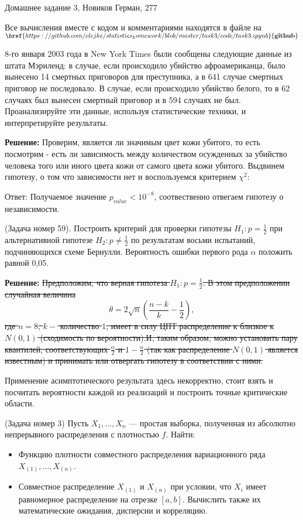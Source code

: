 \documentclass[12pt]{article}
\theoremstyle{definiton}
\theoremstyle{definition}
\theoremstyle{definition}
\newcounter{problem}
\newcounter{subproblem}
\def\prp{\medskip\noindent\stepcounter{problem}{\bf Задача \theproblem .  }\setcounter{subproblem}{0} }
\begin{document}
\centerline{\LARGE Домашнее задание 3, Новиков Герман, 277}

\medskip

Все вычисления вместе с кодом и комментариями находятся в файле на $\href{https://github.com/elejke/statistics_homework/blob/master/task3/code/task3.ipynb}{\textbf{github}}$

\prp 8-го января 2003 года в New York Times были сообщены следующие
данные из штата Мэриленд: в случае, если происходило убийство афроамериканца,
было вынесено 14 смертных приговоров для преступника, а в 641 случае смертных
приговор не последовало. В случае, если происходило убийство белого, то в 62
случаях был вынесен смертный приговор и в 594 случаях не был. Проанализируйте
эти данные, используя статистические техники, и интерпретируйте результаты.


\textbf{Решение: } Проверим, является ли значимым цвет кожи убитого, то есть посмотрим - есть ли зависимость между количеством осужденных за убийство человека того или иного цвета кожи от самого цвета кожи убитого. Выдвинем гипотезу, о том что зависимости нет и воспользуемся критерием $\chi^2$:


Ответ:
Получаемое значение $p_{value} < 10^{-8}$, соотвественно отвегаем гипотезу о независимости.

\prp (Задача номер 59). Построить критерий для проверки гипотезы $H_1 : p = \frac12$ при альтернативной гипотезе $H_2 : p \neq \frac12$ по результатам восьми испытаний, подчиняющихся схеме Бернулли. Вероятность ошибки первого рода $\alpha$ положить равной 0,05.


\textbf{Решение: } \sout{Предположим, что верная гипотеза $H_1 : p = \frac12$. В этом предположении случайная величина} $$\theta = 2\sqrt{n} (\frac{n-k}{k} - \frac12),$$ \sout{где $n = 8$, $k-$ количество $1$, имеет в силу ЦПТ распределение к близкое к $N(0,1)$ (сходимость по вероятности).И, таким образом, можно установить пару квантилей, соответствующих $\frac{\alpha}{2}$ и $1 - \frac{\alpha}{2}$ (так как распределение $N(0,1)$ является известным) и принимать или отвергать гипотезу в соответствии с ними.}

Применение асимптотического результата здесь некорректно, стоит взять и посчитать вероятности каждой из реализаций и построить точные критические области.



\prp (Задача номер 3) Пусть $X_1,...,X_n$ — простая выборка, полученная из
абсолютно непрерывного распределения с плотностью $f$. Найти: 
\begin{itemize}
\item  Функцию плотности совместного распределения вариационного ряда $X_{(1)},...,X_{(n)}$.
\item Совместное распределение $X_{(1)}$ и $X_{(n)}$ при условии, что $X_i$ имеет равномерное распределение на отрезке $[a,b]$. Вычислить также их математические
ожидания, дисперсии и корреляцию.
\end{itemize}
\end{document}
